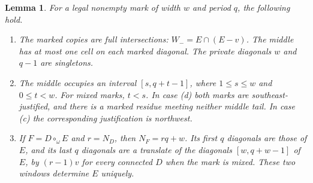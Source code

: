 \documentclass[11pt,a4paper]{amsart}
\numberwithin{equation}{section}
\theoremstyle{plain}
\newtheorem{lemma}[theorem]{Lemma}
\theoremstyle{definition}
\begin{document}
\begin{lemma}\label{lem:gluing-local}
For a legal nonempty mark of width \(w\) and period \(q\), the following hold.
\begin{enumerate}
\item The marked copies are full intersections: \(W_-=E\cap(E-v)\).  The middle has at most one cell on each marked diagonal.  The private diagonals \(w\) and \(q-1\) are singletons.
\item The middle occupies an interval \([s,q+t-1]\), where \(1\le s\le w\) and \(0\le t<w\).  For mixed marks, \(t<s\).  In case (d) both marks are southeast-justified, and there is a marked residue meeting neither middle tail.  In case (c) the corresponding justification is northwest.
\item If \(F=D\circ_\omega E\) and \(r=N_D\), then \(N_F=rq+w\).  Its first \(q\) diagonals are those of \(E\), and its last \(q\) diagonals are a translate of the diagonals \([w,q+w-1]\) of \(E\), by \((r-1)v\) for every connected \(D\) when the mark is mixed.  These two windows determine \(E\) uniquely.
\end{enumerate}
\end{lemma}
\end{document}
